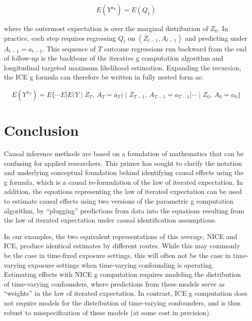 \documentclass[12pt]{article}
\numberwithin{equation}{section}
\begin{document}
\begin{equation}
E(Y^{\overline{a}_T}) = E(Q_1)
\end{equation}

\noindent where the outermost expectation is over the marginal distribution of $Z_0$. In practice, each step requires regressing $Q_{t}$ on $(\overline{Z}_{t-1}, A_{t-1})$ and predicting under $A_{t-1} = a_{t-1}$. This sequence of $T$ outcome regressions run backward from the end of follow-up is the backbone of the iterative g computation algorithm and longitudinal targeted maximum likelihood estimation.\cite{Schomaker2019} Expanding the recursion, the ICE g formula can therefore be written in fully nested form as:

\begin{equation}
E(Y^{\overline{a}_{T}}) = E\bigl\{\cdots E\bigl[ E\bigl(Y\mid \overline{Z}_{T},\, \overline{A}_{T}= \overline{a}_{T}\bigr) \mid \overline{Z}_{T-1},\, A_{T-1}= a_{T-1}\bigr] \cdots \mid Z_0,\, A_0= a_0 \bigr\}
\end{equation}

\section{Conclusion}

Causal inference methods are based on a foundation of mathematics that can be confusing for applied researchers. This primer has sought to clarify the notation and underlying conceptual foundation behind identifying causal effects using the g formula, which is a causal re-formulation of the law of iterated expectation. In addition, the equations representing the law of iterated expectation can be used to estimate causal effects using two versions of the parametric g computation algorithm, by ``plugging'' predictions from data into the equations resulting from the law of iterated expectation under causal identification assumptions. 


In our examples, the two equivalent representations of this average, NICE and ICE, produce identical estimates by different routes. While this may commonly be the case in time-fixed exposure settings, this will often not be the case in time-varying exposure settings when time-varying confounding is operating. Estimating effects with NICE g computation requires modeling the distribution of time-varying confounders, where predictions from these models serve as ``weights'' in the law of iterated expectation.\cite{Cole2013, Naimi2021} In contrast, ICE g computation does not require models for the distribution of time-varying confounders, and is thus robust to misspecification of these models (at some cost in precision).
\end{document}
